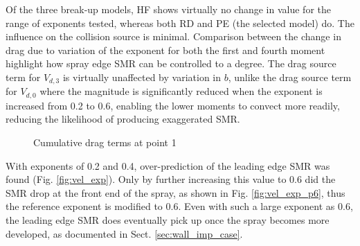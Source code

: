\documentclass[a4paper,10pt]{article}
\begin{document}
Of the three break-up models, HF shows virtually no change in value for the range of exponents tested, whereas both RD and PE (the selected model) do. The influence on the collision source is minimal. Comparison between the change in drag due to variation of the exponent for both the first and fourth moment highlight how spray edge SMR can be controlled to a degree. The drag source term for $V_{d,3}$ is virtually unaffected by variation in $b$, unlike the drag source term for $V_{d,0}$ where the magnitude is significantly reduced when the exponent is increased from 0.2 to 0.6, enabling the lower moments to convect more readily, reducing the likelihood of producing exaggerated SMR.

\begin{figure}[H]
\centering
{}
\caption{Cumulative drag terms at point 1}
\label{fig:s_p1m1drg}
\end{figure}

With exponents of 0.2 and 0.4, over-prediction of the leading edge SMR was found (Fig. \ref{fig:vel_exp}). Only by further increasing this value to 0.6 did the SMR drop at the front end of the spray, as shown in Fig. \ref{fig:vel_exp_p6}, thus the reference exponent is modified to 0.6. Even with such a large exponent as 0.6, the leading edge SMR does eventually pick up once the spray becomes more developed, as documented in Sect. \ref{sec:wall_imp_case}.
\end{document}
